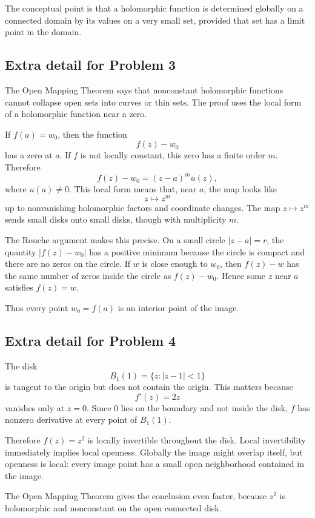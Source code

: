 \documentclass[11pt]{article}
\begin{document}
The conceptual point is that a holomorphic function is determined globally on a connected domain by its values on a very small set, provided that set has a limit point in the domain.

\subsection*{Extra detail for Problem 3}

The Open Mapping Theorem says that nonconstant holomorphic functions cannot collapse open sets into curves or thin sets. The proof uses the local form of a holomorphic function near a zero.

If $f(a)=w_0$, then the function
\[
 f(z)-w_0
\]
has a zero at $a$. If $f$ is not locally constant, this zero has a finite order $m$. Therefore
\[
 f(z)-w_0=(z-a)^m u(z),
\]
where $u(a)\neq0$. This local form means that, near $a$, the map looks like
\[
 z\mapsto z^m
\]
up to nonvanishing holomorphic factors and coordinate changes. The map $z\mapsto z^m$ sends small disks onto small disks, though with multiplicity $m$.

The Rouche argument makes this precise. On a small circle $|z-a|=r$, the quantity $|f(z)-w_0|$ has a positive minimum because the circle is compact and there are no zeros on the circle. If $w$ is close enough to $w_0$, then $f(z)-w$ has the same number of zeros inside the circle as $f(z)-w_0$. Hence some $z$ near $a$ satisfies $f(z)=w$.

Thus every point $w_0=f(a)$ is an interior point of the image.

\subsection*{Extra detail for Problem 4}

The disk
\[
 B_1(1)=\{z:|z-1|<1\}
\]
is tangent to the origin but does not contain the origin. This matters because
\[
 f'(z)=2z
\]
vanishes only at $z=0$. Since $0$ lies on the boundary and not inside the disk, $f$ has nonzero derivative at every point of $B_1(1)$.

Therefore $f(z)=z^2$ is locally invertible throughout the disk. Local invertibility immediately implies local openness. Globally the image might overlap itself, but openness is local: every image point has a small open neighborhood contained in the image.

The Open Mapping Theorem gives the conclusion even faster, because $z^2$ is holomorphic and nonconstant on the open connected disk.
\end{document}
